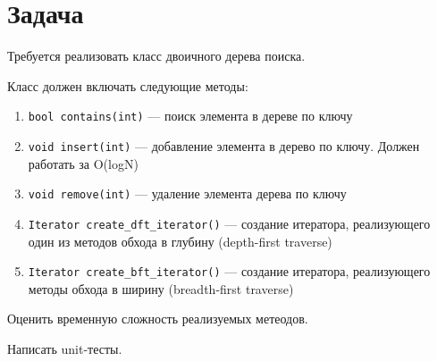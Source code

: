 \section*{Задача}

Требуется реализовать класс двоичного дерева поиска.

Класс должен включать следующие методы:

 \begin{enumerate}
    \item \verb|bool contains(int)| --- поиск элемента в дереве по ключу
    \item \verb|void insert(int)| --- добавление элемента в дерево по ключу. Должен работать за O(logN)
    \item \verb|void remove(int)| --- удаление элемента дерева по ключу
    \item \verb|Iterator create_dft_iterator()| --- создание итератора, реализующего один из методов обхода в глубину (depth-first traverse)
    \item \verb|Iterator create_bft_iterator()| --- создание итератора, реализующего методы обхода в ширину (breadth-first traverse)
 \end{enumerate}

Оценить временную сложность реализуемых метеодов.

Написать unit-тесты.
